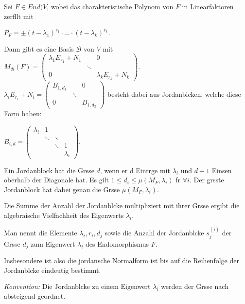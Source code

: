 \documentclass[11pt, a4paper]{article}
\begin{document}
\begin{theorem}
Sei $F \in End(V$, wobei das charakteristische Polynom von $F$ in Linearfaktoren zerf\aee llt mit
\\ \centerline{$P_F = \pm (t - \lambda_1)^{r_1} \cdot ... \cdot (t - \lambda_k)^{r_k}$.}
Dann gibt es eine Basis $\mathcal{B}$ von $V$ mit 
$M_\mathcal{B}(F) = 
\left(\begin{array}{ccc}
\lambda_{1} E_{r_{1}}+N_{1} & & 0 
\\ & \ddots &  
\\ 0 & & \lambda_{k} E_{r_{k}}+N_{k}
\end{array}\right).$
\\ $\lambda_i E_{r_i} + N_i = \left(\begin{array}{ccc}
B_{1, d_1} & & 0 
\\ & \ddots &  
\\ 0 & & B_{1, d_2}
\end{array}\right)$
 besteht dabei aus Jordanbl\oee cken, welche diese Form haben:
\\ \centerline{$B_{i, d} = \left(\begin{array}{cccc}\lambda_{i} & 1 & & 
\\ & \ddots & \ddots & 
\\ & & \ddots & 1 
\\ & & & \lambda_{i}\end{array}\right).$}

Ein Jordanblock hat die Gr\oee sse $d$, wenn er d Eintr\aee ge mit $\lambda_i$ und $d - 1$ Einsen oberhalb der Diagonale hat.
Es gilt $1 \leq d_i \leq \mu (M_F, \lambda_i)$ f\uee r $\forall i$.  Der gr\oee sste Jordanblock hat dabei genau die Gr\oee sse $\mu (M_F, \lambda_i)$.

Die Summe der Anzahl der Jordanbl\oee cke multipliziert mit ihrer Gr\oee sse ergibt die algebraische Vielfachheit des Eigenwerts $\lambda_i$.

Man nennt die Elemente $\lambda_i, r_i, d_j$ sowie die Anzahl der Jordanbl\oee cke $s_j^{(i)}$ der Gr\oee sse $d_j$ zum Eigenwert $\lambda_i$  des Endomorphismus $F$.

Insbesondere ist also die jordansche Normalform ist bis auf die Reihenfolge der Jordanbl\oee cke eindeutig bestimmt.

\textit{Konvention:} Die Jordanbl\oee cke zu einem Eigenwert $\lambda_i$ werden der Gr\oee sse nach absteigend geordnet.
\end{theorem}
\end{document}
